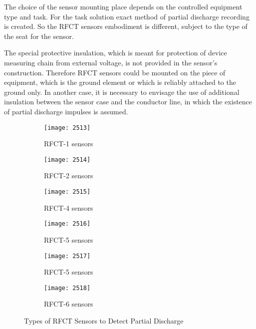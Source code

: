 The choice of the sensor mounting place depends on the controlled equipment type and task. For the task solution exact method of partial discharge recording is created. So the RFCT sensors embodiment is different, subject to the type of the seat for the sensor.

The special protective insulation, which is meant for protection of device measuring chain from external voltage, is not provided in the sensor’s construction. Therefore RFCT sensors could be mounted on the piece of equipment, which is the ground element or which is reliably attached to the ground only. In another case, it is necessary to envisage the use of additional insulation between the sensor case and the conductor line, in which the existence of partial discharge impulses is assumed\setlength{\parskip}{0em}. 

\begin{figure}[b!]
    \centering
    \begin{subfigure}[b]{0.49\textwidth}
        \centering
        \texttt{[image: 2513]}
        \caption{RFCT-1 sensors }
    \end{subfigure}
    \begin{subfigure}[b]{0.49\textwidth}
        \centering
        \texttt{[image: 2514]}
        \caption{RFCT-2 sensors }
    \end{subfigure}
    
    \begin{subfigure}[b]{0.49\textwidth}
        \centering
        \texttt{[image: 2515]}
        \caption{RFCT-4 sensors }
    \end{subfigure}
    \begin{subfigure}[b]{0.49\textwidth}
        \centering
        \texttt{[image: 2516]}
        \caption{RFCT-5 sensors }
    \end{subfigure}
    
    \begin{subfigure}[b]{0.49\textwidth}
        \centering
        \texttt{[image: 2517]}
        \caption{RFCT-5 sensors }
    \end{subfigure}
    \begin{subfigure}[b]{0.49\textwidth}
        \centering
        \texttt{[image: 2518]}
        \caption{RFCT-6 sensors }
    \end{subfigure}
    
    \caption{Types of RFCT Sensors to Detect Partial Discharge}
    \label{fig:Types of RFCT Sensors to Detect Partial Discharge}
\end{figure}

